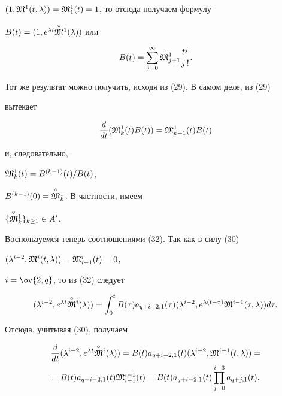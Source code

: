 $(1,\frak M^1(t,\lambda))=\frak M^1_1(t)=1$, то отсюда получаем формулу 


$B(t)=(1,e^{\lambda t}\overset{\circ}{\frak M}{}^1(\lambda))$ или 


\begin{equation} 


B(t)=\sum^\infty_{j=0}\up{\circ}{\frak M}^1_{j+1} 


\frac{t^j}{j\,!}. 


\end{equation} 


Тот же результат можно получить, исходя из (29). В самом деле, из (29) 


вытекает 


$$ 


\frac{d}{dt}(\frak M^1_k(t)B(t))=\frak M^1_{k+1}(t)B(t) 


$$ 


и, следовательно, 


$\frak M^1_k(t)=B^{(k-1)}(t)/B(t)$, 


$B^{(k-1)}(0)=\overset{\circ}{\frak M}{}^1_k$. В частности, имеем 


$\{\overset{\circ}{\frak M}{}^1_k\}_{k\ge 1}\in A'$. 


 


Воспользуемся теперь соотношениями (32). Так как в силу (30)\; 


$(\lambda^{i-2},\frak M^i(t,\lambda))=\frak M^i_{i-1}(t)=0$, 


$i=\ov{2,q}$, то из (32) следует 


$$ 


(\lambda^{i-2},e^{\lambda t}\up{\circ}{\frak M}^i(\lambda))= 


\int^t_0 B(\tau)a_{q+i-2,1}(\tau) 


(\lambda^{i-2},e^{\lambda(t-\tau)}\frak M^{i-1}(\tau,\lambda))d\tau. 


$$ 


Отсюда, учитывая (30), получаем 


\begin{multline*} 


\frac{d}{dt}(\lambda^{i-2},e^{\lambda t}\up{\circ}{\frak M}^i(\lambda))= 


B(t)a_{q+i-2,1}(t)(\lambda^{i-2},\frak M^{i-1}(t,\lambda)) = \\ 


=B(t)a_{q+i-2,1}(t)\frak M^{i-1}_{i-1}(t)=B(t) 


a_{q+i-2,1}(t)\prod^{i-3}_{j=0}a_{q+j,1}(t). 


\end{multline*} 


